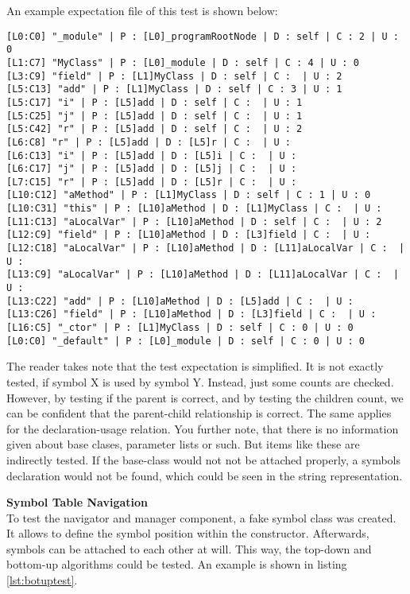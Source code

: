 An example expectation file of this test is shown below:

\begin{verbatim}
[L0:C0] "_module" | P : [L0]_programRootNode | D : self | C : 2 | U : 0
[L1:C7] "MyClass" | P : [L0]_module | D : self | C : 4 | U : 0
[L3:C9] "field" | P : [L1]MyClass | D : self | C :  | U : 2
[L5:C13] "add" | P : [L1]MyClass | D : self | C : 3 | U : 1
[L5:C17] "i" | P : [L5]add | D : self | C :  | U : 1
[L5:C25] "j" | P : [L5]add | D : self | C :  | U : 1
[L5:C42] "r" | P : [L5]add | D : self | C :  | U : 2
[L6:C8] "r" | P : [L5]add | D : [L5]r | C :  | U :
[L6:C13] "i" | P : [L5]add | D : [L5]i | C :  | U :
[L6:C17] "j" | P : [L5]add | D : [L5]j | C :  | U :
[L7:C15] "r" | P : [L5]add | D : [L5]r | C :  | U :
[L10:C12] "aMethod" | P : [L1]MyClass | D : self | C : 1 | U : 0
[L10:C31] "this" | P : [L10]aMethod | D : [L1]MyClass | C :  | U :
[L11:C13] "aLocalVar" | P : [L10]aMethod | D : self | C :  | U : 2
[L12:C9] "field" | P : [L10]aMethod | D : [L3]field | C :  | U :
[L12:C18] "aLocalVar" | P : [L10]aMethod | D : [L11]aLocalVar | C :  | U :
[L13:C9] "aLocalVar" | P : [L10]aMethod | D : [L11]aLocalVar | C :  | U :
[L13:C22] "add" | P : [L10]aMethod | D : [L5]add | C :  | U :
[L13:C26] "field" | P : [L10]aMethod | D : [L3]field | C :  | U :
[L16:C5] "_ctor" | P : [L1]MyClass | D : self | C : 0 | U : 0
[L0:C0] "_default" | P : [L0]_module | D : self | C : 0 | U : 0
\end{verbatim}

The reader takes note that the test expectation is simplified.
It is not exactly tested, if symbol X is used by symbol Y.
Instead, just some counts are checked.
However, by testing if the parent is correct, and by testing the children count, we can be confident that the parent-child relationship is correct.
The same applies for the declaration-usage relation.
You further note, that there is no information given about base clases, parameter lists or such.
But items like these are indirectly tested.
If the base-class would not not be attached properly, a symbols declaration would not be found, which could be seen in the string representation.

\textbf{Symbol Table Navigation}\\
To test the navigator and manager component, a fake symbol class was created.
It allows to define the symbol position within the constructor.
Afterwards, symbols can be attached to each other at will.
This way, the top-down and bottom-up algorithms could be tested.
An example is shown in listing \ref{lst:botuptest}.

